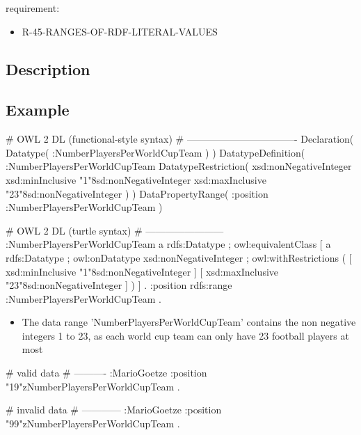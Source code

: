 \documentclass{llncs}
\begin{document}
requirement:

\begin{itemize}
	\item R-45-RANGES-OF-RDF-LITERAL-VALUES
\end{itemize}

\subsection{Description}

\subsection{Example}

\begin{ex}
# OWL 2 DL (functional-style syntax)
# ----------------------------------
Declaration( Datatype( :NumberPlayersPerWorldCupTeam ) ) 
DatatypeDefinition( 
    :NumberPlayersPerWorldCupTeam
    DatatypeRestriction( 
        xsd:nonNegativeInteger 
        xsd:minInclusive "1"^^xsd:nonNegativeInteger 
        xsd:maxInclusive "23"^^xsd:nonNegativeInteger ) )     
DataPropertyRange( :position :NumberPlayersPerWorldCupTeam ) 
\end{ex}

\begin{ex}
# OWL 2 DL (turtle syntax)
# ------------------------
:NumberPlayersPerWorldCupTeam
    a rdfs:Datatype ;
    owl:equivalentClass [
        a rdfs:Datatype ;
        owl:onDatatype xsd:nonNegativeInteger ;
        owl:withRestrictions ( 
            [ xsd:minInclusive "1"^^xsd:nonNegativeInteger ]
            [ xsd:maxInclusive "23"^^xsd:nonNegativeInteger ] ) ] .
:position rdfs:range :NumberPlayersPerWorldCupTeam .
\end{ex}

\begin{itemize}
	\item The data range 'NumberPlayersPerWorldCupTeam' contains the non negative integers 1 to 23, as each world cup team can only have 23 football players at most
\end{itemize}

\begin{ex}
# valid data
# ----------
:MarioGoetze
    :position "19"^^:NumberPlayersPerWorldCupTeam .
\end{ex}

\begin{ex}
# invalid data
# ------------
:MarioGoetze
    :position "99"^^:NumberPlayersPerWorldCupTeam .
\end{ex}
\end{document}
